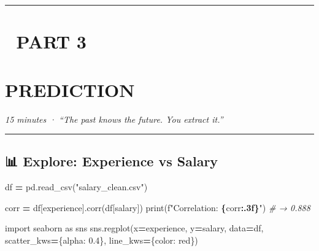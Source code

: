 \documentclass[
]{article}
\newenvironment{Shaded}{\begin{snugshade}}{\end{snugshade}}
\newcommand{\BuiltInTok}[1]{#1}
\newcommand{\CommentTok}[1]{\textcolor[rgb]{0.56,0.35,0.01}{\textit{#1}}}
\newcommand{\FloatTok}[1]{\textcolor[rgb]{0.00,0.00,0.81}{#1}}
\newcommand{\ImportTok}[1]{#1}
\newcommand{\NormalTok}[1]{#1}
\newcommand{\OperatorTok}[1]{\textcolor[rgb]{0.81,0.36,0.00}{\textbf{#1}}}
\newcommand{\SpecialCharTok}[1]{\textcolor[rgb]{0.81,0.36,0.00}{\textbf{#1}}}
\newcommand{\SpecialStringTok}[1]{\textcolor[rgb]{0.31,0.60,0.02}{#1}}
\newcommand{\StringTok}[1]{\textcolor[rgb]{0.31,0.60,0.02}{#1}}
\begin{document}
\begin{center}\rule{0.5\linewidth}{0.5pt}\end{center}

\section{🔮 PART 3}\label{part-3}

\section{PREDICTION}\label{prediction}

\emph{15 minutes · ``The past knows the future. You extract it.''}

\begin{center}\rule{0.5\linewidth}{0.5pt}\end{center}

\subsection{📊 Explore: Experience vs
Salary}\label{explore-experience-vs-salary}

\begin{Shaded}
\begin{Highlighting}[]
\NormalTok{df }\OperatorTok{=}\NormalTok{ pd.read\_csv(}\StringTok{"salary\_clean.csv"}\NormalTok{)}

\NormalTok{corr }\OperatorTok{=}\NormalTok{ df[}\StringTok{\textquotesingle{}experience\textquotesingle{}}\NormalTok{].corr(df[}\StringTok{\textquotesingle{}salary\textquotesingle{}}\NormalTok{])}
\BuiltInTok{print}\NormalTok{(}\SpecialStringTok{f"Correlation: }\SpecialCharTok{\{}\NormalTok{corr}\SpecialCharTok{:.3f\}}\SpecialStringTok{"}\NormalTok{)    }\CommentTok{\# → 0.888}

\ImportTok{import}\NormalTok{ seaborn }\ImportTok{as}\NormalTok{ sns}
\NormalTok{sns.regplot(x}\OperatorTok{=}\StringTok{\textquotesingle{}experience\textquotesingle{}}\NormalTok{, y}\OperatorTok{=}\StringTok{\textquotesingle{}salary\textquotesingle{}}\NormalTok{, data}\OperatorTok{=}\NormalTok{df,}
\NormalTok{            scatter\_kws}\OperatorTok{=}\NormalTok{\{}\StringTok{\textquotesingle{}alpha\textquotesingle{}}\NormalTok{: }\FloatTok{0.4}\NormalTok{\},}
\NormalTok{            line\_kws}\OperatorTok{=}\NormalTok{\{}\StringTok{\textquotesingle{}color\textquotesingle{}}\NormalTok{: }\StringTok{\textquotesingle{}red\textquotesingle{}}\NormalTok{\})}
\end{Highlighting}
\end{Shaded}
\end{document}
